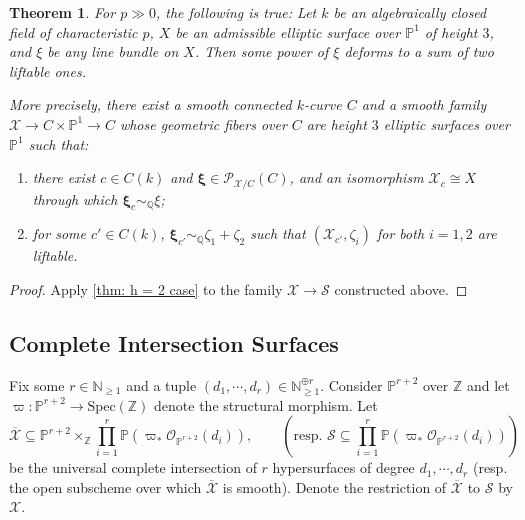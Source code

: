 \documentclass[letter, 11pt]{article}
\theoremstyle{plain}
\newtheorem{theorem}[subsubsection]{Theorem}
\theoremstyle{definition}
\newcommand{\IF}{\mathbb{F}}
\newcommand{\IN}{\mathbb{N}}
\newcommand{\IP}{\mathbb{P}}
\newcommand{\IQ}{\mathbb{Q}}
\newcommand{\IZ}{\mathbb{Z}}
\newcommand{\Spec}{\mathrm{Spec}}
\newcommand{\<}{\langle}
\renewcommand{\>}{\rangle}
\newcommand{\sX}{\mathcal{X}}
\newcommand{\sS}{\mathcal{S}}
\newcommand{\sO}{\mathcal{O}}
\newcommand{\Pic}{\mathrm{Pic}}
\newcommand{\shP}{\mathscr{P}}
\newcommand{\bxi}{\boldsymbol{\xi}}
\begin{document}
\begin{theorem}
    For $p \gg 0$, the following is true: Let $k$ be an algebraically closed field of characteristic $p$, $X$ be an admissible elliptic surface over $\IP^1$ of height $3$, and $\xi$ be any line bundle on $X$. Then some power of $\xi$ deforms to a sum of two liftable ones. 
    
    More precisely, there exist a smooth connected $k$-curve $C$ and a smooth family $\sX \to C \times \IP^1 \to C$ whose geometric fibers over $C$ are height $3$ elliptic surfaces over $\IP^1$ such that: 
    \begin{enumerate}[label=\upshape{(\roman*)}]
        \item there exist $c \in C(k)$ and $\bxi \in \shP_{\sX/C}(C)$, and an isomorphism $\sX_c \cong X$ through which $\bxi_c \sim_\IQ \xi$; 
        \item for some $c' \in C(k)$, $\bxi_{c'} \sim_\IQ \zeta_1 + \zeta_2$ such that $(\sX_{c'}, \zeta_i)$ for both $i = 1, 2$ are liftable. 
    \end{enumerate}
\end{theorem}
\begin{proof}
    Apply \ref{thm: h = 2 case} to the family $\sX \to \sS$ constructed above. 
\end{proof}






\subsection{Complete Intersection Surfaces}

Fix some $r \in \IN_{\ge 1}$ and a tuple $(d_1, \cdots, d_r) \in \IN_{\ge 1}^{\oplus r}$. Consider $\IP^{r + 2}$ over $\IZ$ and let $\varpi : \IP^{r + 2} \to \Spec(\IZ)$ denote the structural morphism. Let 
\[ \overline{\sX} \subseteq \IP^{r + 2} \times_\IZ \prod_{i = 1}^r \IP( \varpi_* \sO_{\IP^{r + 2}}(d_i)), \hspace{2em} \left(\textrm{resp. } \sS \subseteq \prod_{i = 1}^r \IP( \varpi_* \sO_{\IP^{r + 2}}(d_i)) \right) \]
be the universal complete intersection of $r$ hypersurfaces of degree $d_1, \cdots, d_r$ (resp. the open subscheme over which $\overline{\sX}$ is smooth). Denote the restriction of $\overline{\sX}$ to $\sS$ by $\sX$. 
\end{document}
